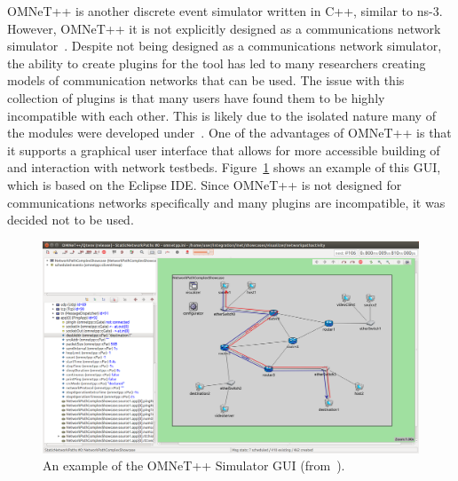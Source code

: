 OMNeT++ is another discrete event simulator written in C++, similar to ns-3.
However, OMNeT++ it is not explicitly designed as a communications network simulator~\cite{omnet++}.
Despite not being designed as a communications network simulator, the ability to create plugins for the tool has led to many researchers creating models of communication networks that can be used.
The issue with this collection of plugins is that many users have found them to be highly incompatible with each other.
This is likely due to the isolated nature many of the modules were developed under~\cite{tool_survey}.
One of the advantages of OMNeT++ is that it supports a graphical user interface that allows for more accessible building of and interaction with network testbeds.
Figure~\ref{omnet_gui} shows an example of this GUI, which is based on the Eclipse IDE.
Since OMNeT++ is not designed for communications networks specifically and many plugins are incompatible, it was decided not to be used.

\begin{figure}[!ht]
    \centering
    \includegraphics[width=\textwidth,keepaspectratio]{Images/Chpt2/omnet_gui.png}
    \caption{An example of the OMNeT++ Simulator GUI (from~\cite{omnet++}).}
    \label{omnet_gui}
\end{figure}

